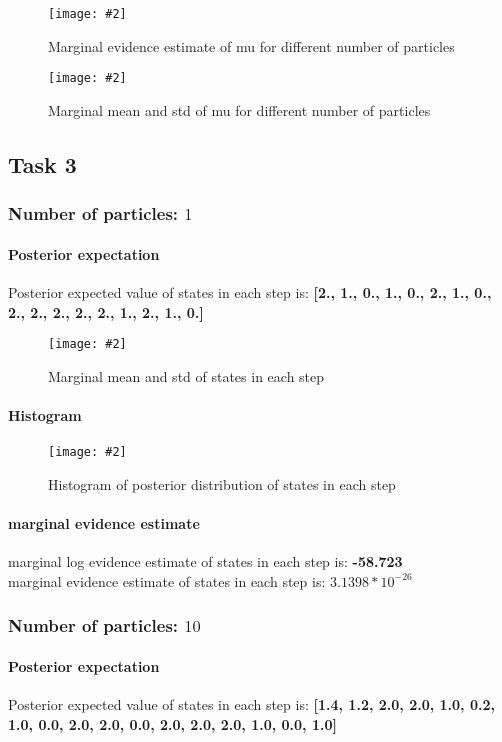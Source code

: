 \documentclass{article}
\newcommand{\centerfigcap}[3]{\begin{figure}[H]
\begin{center}\texttt{[image: \#2]} \caption{#3}\end{center}
\end{figure}}
\begin{document}
\begin{minipage}{.5\textwidth}
  \centering
\centerfigcap{1}{../Figures/Evidence_2}{Marginal evidence estimate of mu for different number of particles}
\end{minipage}%
\begin{minipage}{.5\textwidth}
  \centering
\centerfigcap{1}{../Figures/Mean-Std_2}{Marginal mean and std of mu for different number of particles}
\end{minipage}


\subsection{Task 3}
\subsubsection{Number of particles: $1$}
\paragraph{Posterior expectation}
Posterior expected value of states in each step is: \textbf{[2., 1., 0., 1., 0., 2., 1., 0., 2., 2., 2., 2., 2., 1., 2., 1., 0.]}\\

\centerfigcap{0.6}{../Figures/Mean-Std_3_0}{Marginal mean and std of states in each step}

\paragraph{Histogram}
\centerfigcap{0.7}{../Figures/Histogram_3_0}{Histogram of posterior distribution of states in each step}
\paragraph{marginal evidence estimate}
marginal log evidence estimate of states in each step is: \textbf{-58.723}\\
marginal evidence estimate of states in each step is: \textbf{$3.1398*10^{-26}$}\\

\subsubsection{Number of particles: $10$}
\paragraph{Posterior expectation}
Posterior expected value of states in each step is: \textbf{[1.4, 1.2, 2.0, 2.0, 1.0, 0.2, 1.0, 0.0, 2.0,
2.0, 0.0, 2.0, 2.0, 2.0, 1.0, 0.0, 1.0]}\\
\end{document}
